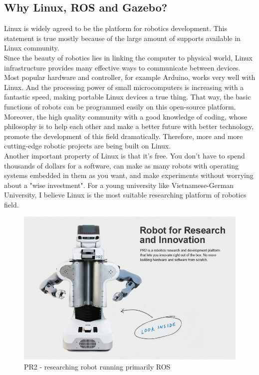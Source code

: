 \documentclass[pdftex,12pt,a4paper]{article}
\begin{document}
  \subsection{Why Linux, ROS and Gazebo?}
  Linux is widely agreed to be the platform for robotics development. This statement is true mostly because of the large amount of supports available in Linux community.\\
  Since the beauty of robotics lies in linking the computer to physical world, Linux infrastructure provides many effective ways to communicate between devices. Most popular hardware and controller, for example Arduino, works very well with Linux. And the processing power of small microcomputers is increasing with a fantastic speed, making portable Linux devices a true thing. That way, the basic functions of robots can be programmed easily on this open-source platform. Moreover, the high quality community with a good knowledge of coding, whose philosophy is to help each other and make a better future with better technology, promote the development of this field dramatically. Therefore, more and more cutting-edge robotic projects are being built on Linux.\\
  Another important property of Linux is that it's free. You don't have to spend thousands of dollars for a software, can make as many robots with operating systems embedded in them as you want, and make experiments without worrying about a "wise investment". For a young university like Vietnamese-German University, I believe Linux is the most suitable researching platform of robotics field.\par
  \begin{figure}[h]
      \centering
      \includegraphics[width=0.8\linewidth]{image/pr2.jpg}
      \caption{PR2 - researching robot running primarily ROS}
      \label{fig:pr2_robot}
  \end{figure}
\end{document}
